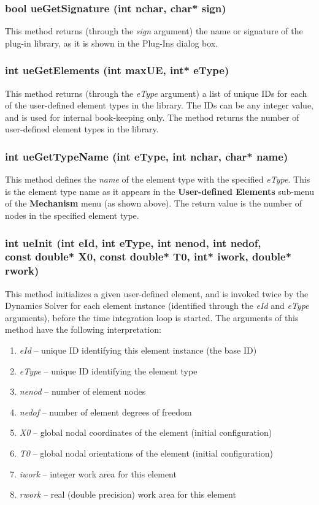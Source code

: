 \subsubsection{bool ueGetSignature (int nchar, char* sign)}

This method returns (through the {\sl sign} argument) the name or signature
of the plug-in library, as it is shown in the Plug-Ins dialog box.

\subsubsection{int ueGetElements (int maxUE, int* eType)}

This method returns (through the {\sl eType} argument) a list of unique
IDs for each of the user-defined element types in the library. The IDs
can be any integer value, and is used for internal book-keeping only.
The method returns the number of user-defined element types in the library.

\subsubsection{int ueGetTypeName (int eType, int nchar, char* name)}

This method defines the {\sl name} of the element type with the specified
{\sl eType}. This is the element type name as it appears in the
\textbf{User-defined Elements} sub-menu of the \textbf{Mechanism} menu
(as shown above). The return value is the number of nodes in the specified
element type.

\subsubsection{int ueInit (int eId, int eType, int nenod, int nedof, \\
  const double* X0, const double* T0, int* iwork, double* rwork)}

This method initializes a given user-defined element, and is invoked twice by
the Dynamics Solver for each element instance (identified through the {\sl eId}
and {\sl eType} arguments), before the time integration loop is started.
The arguments of this method have the following interpretation:

\begin{enumerate}
\item{\sl eId} --
  unique ID identifying this element instance (the base ID)
\item{\sl eType} --
  unique ID identifying the element type
\item{\sl nenod} --
  number of element nodes
\item{\sl nedof} --
  number of element degrees of freedom
\item{\sl X0} --
  global nodal coordinates of the element (initial configuration)
\item{\sl T0} --
  global nodal orientations of the element (initial configuration)
\item{\sl iwork} --
  integer work area for this element
\item{\sl rwork} --
  real (double precision) work area for this element
\end{enumerate}

